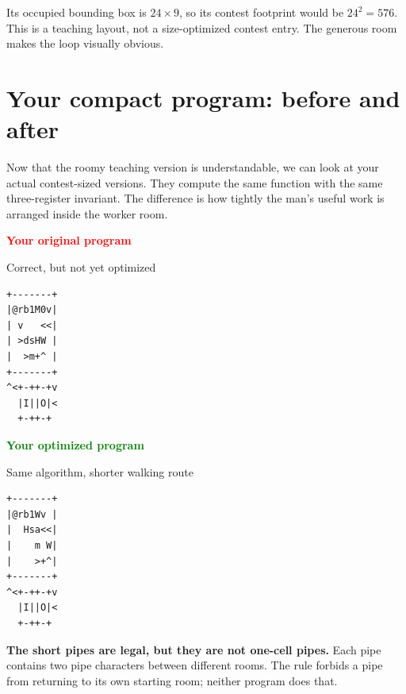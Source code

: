 \documentclass[11pt,a4paper]{article}
\begin{document}
Its occupied bounding box is \(24\times9\), so its contest footprint would be
\(24^2=576\). This is a teaching layout, not a size-optimized contest entry.
The generous room makes the loop visually obvious.

\clearpage
\section{Your compact program: before and after}

Now that the roomy teaching version is understandable, we can look at your
actual contest-sized versions. They compute the same function with the same
three-register invariant. The difference is how tightly the man's useful
work is arranged inside the worker room.

\begin{center}
\begin{minipage}[t]{0.47\textwidth}
  \centering
  {\large\bfseries\textcolor{red}{Your original program}}\par
  \smallskip
  \textcolor{muted}{Correct, but not yet optimized}
  \begin{plainbox}
\begin{Verbatim}[fontsize=\small]
+-------+
|@rb1M0v|
| v   <<|
| >dsHW |
|  >m+^ |
+-------+
^<+-++-+v
  |I||O|<
  +-++-+
\end{Verbatim}
  \end{plainbox}
\end{minipage}
\hfill
\begin{minipage}[t]{0.47\textwidth}
  \centering
  {\large\bfseries\textcolor{green}{Your optimized program}}\par
  \smallskip
  \textcolor{muted}{Same algorithm, shorter walking route}
  \begin{plainbox}
\begin{Verbatim}[fontsize=\small]
+-------+
|@rb1Wv |
|  Hsa<<|
|    m W|
|    >+^|
+-------+
^<+-++-+v
  |I||O|<
  +-++-+
\end{Verbatim}
  \end{plainbox}
\end{minipage}
\end{center}

\begin{warningbox}
  \textbf{The short pipes are legal, but they are not one-cell pipes.}
  Each pipe contains two pipe characters between different rooms. The rule
  forbids a pipe from returning to its own starting room; neither program
  does that.
\end{warningbox}
\end{document}

